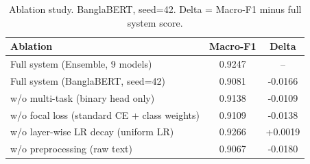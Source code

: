 \begin{table}[t]
\centering
\caption{Ablation study. BanglaBERT, seed=42. Delta = Macro-F1 minus full system score.}
\label{tab:ablations}
\begin{tabular}{lcc}
\toprule
Ablation & Macro-F1 & Delta \\
\midrule
Full system (Ensemble, 9 models) & 0.9247 & -- \\
Full system (BanglaBERT, seed=42) & 0.9081 & -0.0166 \\
w/o multi-task (binary head only) & 0.9138 & -0.0109 \\
w/o focal loss (standard CE + class weights) & 0.9109 & -0.0138 \\
w/o layer-wise LR decay (uniform LR) & 0.9266 & +0.0019 \\
w/o preprocessing (raw text) & 0.9067 & -0.0180 \\
\bottomrule
\end{tabular}
\end{table}
